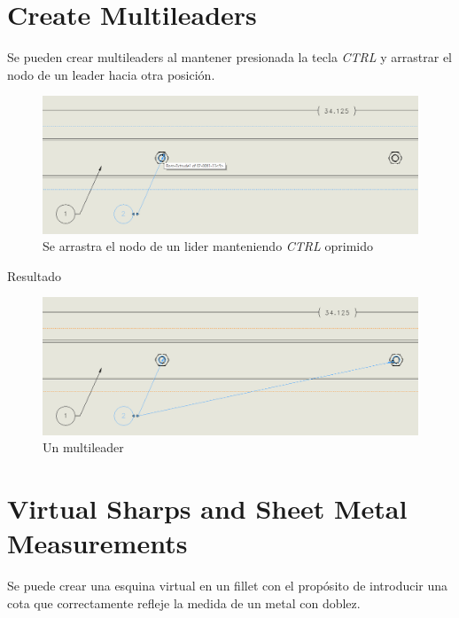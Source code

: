 \documentclass{report}
\begin{document}
\chapter{Create Multileaders}

Se pueden crear multileaders al mantener presionada la tecla \emph{CTRL} y arrastrar el nodo de un leader hacia otra posición.

\begin{figure}[H]
	\centering
	\includegraphics[width=0.85\linewidth, height=0.5\textheight,keepaspectratio]{Imagenes/solidworks_multileader01}
	\caption{Se arrastra el nodo de un lider manteniendo \emph{CTRL} oprimido}
	\label{fig:solidworksmultileader01}
\end{figure}

{\LARGE Resultado}

\begin{figure}[H]
	\centering
	\includegraphics[width=0.85\linewidth, height=0.5\textheight,keepaspectratio]{Imagenes/solidworks_multileader02}
	\caption{Un multileader}
	\label{fig:solidworksmultileader02}
\end{figure}

\chapter{Virtual Sharps and Sheet Metal Measurements}

Se puede crear una esquina virtual en un fillet con el propósito de introducir una cota que correctamente refleje la medida de un metal con doblez.
\end{document}
